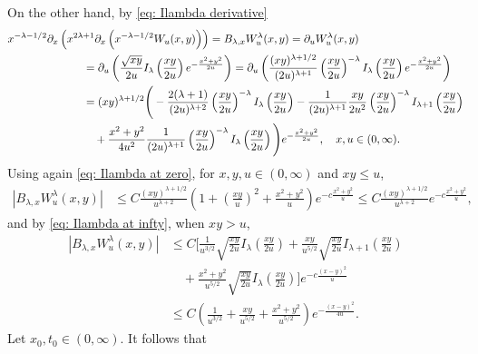 \documentclass[a4paper,10pt, reqno]{amsart}
\theoremstyle{definition}
\theoremstyle{remark}
\numberwithin{equation}{section}
\begin{document}
On the other hand, by \eqref{eq: Ilambda derivative}
\begin{align*}
x^{-\lambda -1/2}\partial_x\left(x^{2\lambda +1}\partial_x\left(x^{-\lambda -1/2}W_u(x,y)\right)\right)&=B_{\lambda ,x}W_u^\lambda (x,y)=\partial_uW_u^\lambda (x,y)\\
&\hspace{-4cm}=\partial_u\left(\frac{\sqrt{xy}}{2u}I_\lambda \left(\frac{xy}{2u}\right)e^{-\frac{x^2+y^2}{2u}}\right)= \partial_u\left(\frac{(xy)^{\lambda+1/2}}{(2u)^{\lambda +1}}\left(\frac{xy}{2u}\right)^{-\lambda }I_\lambda \left(\frac{xy}{2u}\right)e^{-\frac{x^2+y^2}{2u}}\right)\\
&\hspace{-4cm}=(xy)^{\lambda+1/2}\Bigg(-\frac{2(\lambda+1)}{(2u)^{\lambda +2}}\left(\frac{xy}{2u}\right)^{-\lambda }I_\lambda \left(\frac{xy}{2u}\right)-\frac{1}{(2u)^{\lambda +1}}\frac{xy}{2u^2}\left(\frac{xy}{2u}\right)^{-\lambda }I_{\lambda+1} \left(\frac{xy}{2u}\right)\\
&\hspace{-4cm}\quad +\frac{x^2+y^2}{4u^2}\frac{1}{(2u)^{\lambda +1}}\left(\frac{xy}{2u}\right)^{-\lambda }I_\lambda \left(\frac{xy}{2u}\right)\Bigg)e^{-\frac{x^2+y^2}{2u}},\quad x,u\in (0,\infty).
\end{align*}
Using again \eqref{eq: Ilambda at zero}, for $x,y,u\in (0,\infty)$ and $xy\leq u$,
\begin{align*}
|B_{\lambda ,x}W_u^\lambda (x,y)|&\leq C\frac{(xy)^{\lambda+1/2}}{u^{\lambda +2}}\left(1+\left(\frac{xy}{u}\right)^2+\frac{x^2+y^2}{u}\right)e^{-c\frac{x^2+y^2}{u}}\leq C\frac{(xy)^{\lambda+1/2}}{u^{\lambda +2}}e^{-c\frac{x^2+y^2}{u}},  
\end{align*}
and by \eqref{eq: Ilambda at infty}, when $xy>u$,
\begin{align*}
|B_{\lambda ,x}W_u^\lambda (x,y)|&\leq C\Bigg[\frac{1}{u^{3/2}}\sqrt{\frac{xy}{2u}}I_\lambda \left(\frac{xy}{2u}\right)+\frac{xy}{u^{5/2}}\sqrt{\frac{xy}{2u}}I_{\lambda +1} \left(\frac{xy}{2u}\right)\\
&\quad +\frac{x^2+y^2}{u^{5/2}}\sqrt{\frac{xy}{2u}}I_\lambda \left(\frac{xy}{2u}\right)\Bigg]e^{-c\frac{(x-y)^2}{u}}\\
&\leq C\left(\frac{1}{u^{3/2}}+\frac{xy}{u^{5/2}}+\frac{x^2+y^2}{u^{5/2}}\right)e^{-\frac{(x-y)^2}{4u}}. 
\end{align*}
Let $x_0,t_0\in (0,\infty)$. It follows that
\end{document}
